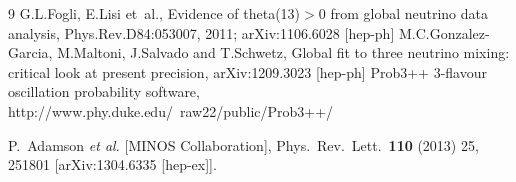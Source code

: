 \begin{thebibliography}{9}
% 
%
%
%
  G.L.Fogli, E.Lisi et~al.,
  Evidence of theta(13)$>$0 from global neutrino data analysis,
  Phys.Rev.D84:053007, 2011; arXiv:1106.6028 [hep-ph]
 M.C.Gonzalez-Garcia, M.Maltoni, J.Salvado and T.Schwetz,
 Global fit to three neutrino mixing: critical look at present precision,
 arXiv:1209.3023 [hep-ph]
%
%
%
%
 Prob3++ 3-flavour oscillation probability software,
 http://www.phy.duke.edu/~raw22/public/Prob3++/
 
  P.~Adamson {\it et al.}  [MINOS Collaboration],
  Phys.\ Rev.\ Lett.\  {\bf 110} (2013) 25,  251801
  [arXiv:1304.6335 [hep-ex]].

\end{thebibliography}



